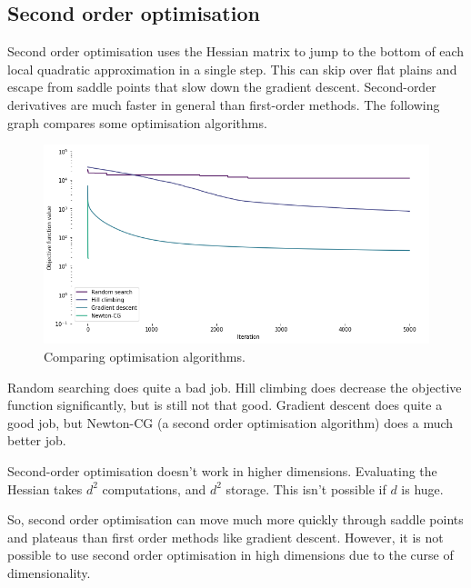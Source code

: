 \documentclass[a4paper, openany]{memoir}
\begin{document}
\subsection{Second order optimisation}
Second order optimisation uses the Hessian matrix to jump to the bottom of each local quadratic approximation in a single step. This can skip over flat plains and escape from saddle points that slow down the gradient descent. Second-order derivatives are much faster in general than first-order methods. The following graph compares some optimisation algorithms.
\begin{figure}[H]
    \centering
    \includegraphics[scale=0.45]{src/4.34 comparing optimisation algorithms.png}
    \caption{Comparing optimisation algorithms.}
\end{figure}
\noindent Random searching does quite a bad job. Hill climbing does decrease the objective function significantly, but is still not that good. Gradient descent does quite a good job, but Newton-CG (a second order optimisation algorithm) does a much better job.

Second-order optimisation doesn't work in higher dimensions. Evaluating the Hessian takes $d^2$ computations, and $d^2$ storage. This isn't possible if $d$ is huge.

So, second order optimisation can move much more quickly through saddle points and plateaus than first order methods like gradient descent. However, it is not possible to use second order optimisation in high dimensions due to the curse of dimensionality.
\end{document}
